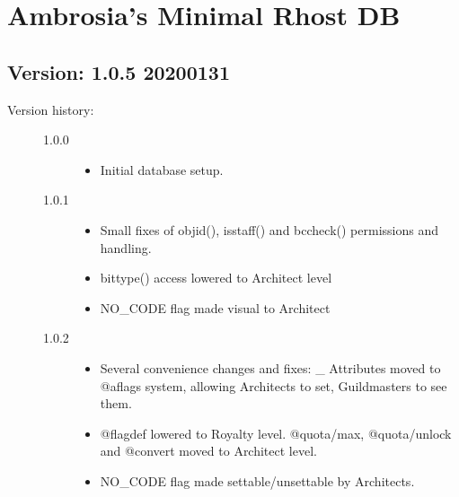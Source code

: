 \documentclass[letterpaper,10pt,english]{sphinxmanual}
\begin{document}
\chapter{Ambrosia’s Minimal Rhost DB}
\label{\detokenize{42-ambrosiadb:ambrosia-s-minimal-rhost-db}}\label{\detokenize{42-ambrosiadb::doc}}

\section{Version: 1.0.5          2020\sphinxhyphen{}01\sphinxhyphen{}31}
\label{\detokenize{42-ambrosiadb:version-1-0-5-2020-01-31}}\begin{description}
\item[{Version history:}] \leavevmode\begin{description}
\item[{1.0.0}] \leavevmode\begin{itemize}
\item {} 
\sphinxAtStartPar
Initial database setup.

\end{itemize}

\item[{1.0.1}] \leavevmode\begin{itemize}
\item {} 
\sphinxAtStartPar
Small fixes of objid(), isstaff() and bccheck() permissions and handling.

\item {} 
\sphinxAtStartPar
bittype() access lowered to Architect level

\item {} 
\sphinxAtStartPar
NO\_CODE flag made visual to Architect

\end{itemize}

\item[{1.0.2}] \leavevmode\begin{itemize}
\item {} 
\sphinxAtStartPar
Several convenience changes and fixes: \_ Attributes moved to @aflags
system, allowing Architects to set, Guildmasters to see them.

\item {} 
\sphinxAtStartPar
@flagdef lowered to Royalty level. @quota/max, @quota/unlock and @convert
moved to Architect level.

\item {} 
\sphinxAtStartPar
NO\_CODE flag made settable/unsettable by Architects.


\end{itemize}
\end{description}
\end{description}
\end{document}
